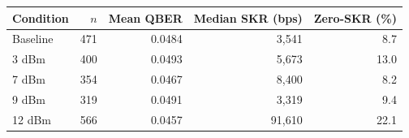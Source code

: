 \begin{tabular}{lrrrr}
\toprule
Condition & $n$ & Mean QBER & Median SKR (bps) & Zero-SKR (\%) \\
\midrule
Baseline & 471 & 0.0484 &  3,541 & 8.7 \\
3 dBm & 400 & 0.0493 &  5,673 & 13.0 \\
7 dBm & 354 & 0.0467 &  8,400 & 8.2 \\
9 dBm & 319 & 0.0491 &  3,319 & 9.4 \\
12 dBm & 566 & 0.0457 & 91,610 & 22.1 \\
\bottomrule
\end{tabular}
